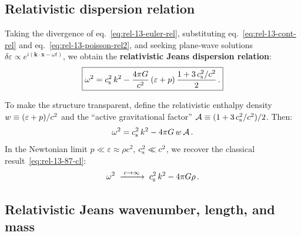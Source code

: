 \subsection{Relativistic dispersion relation}
\label{sec:rel-13-119d}

Taking the divergence of eq.~\eqref{eq:rel-13-euler-rel},
substituting eq.~\eqref{eq:rel-13-cont-rel} and
eq.~\eqref{eq:rel-13-poisson-rel2}, and seeking plane-wave
solutions $\delta\varepsilon \propto
e^{i(\mathbf{k}\cdot\mathbf{x} - \omega t)}$, we obtain the
\textbf{relativistic Jeans dispersion relation}:
\begin{equation}
\label{eq:rel-13-dispersion}
\boxed{
  \omega^{2}
  = c_{\mathrm{s}}^{2}\,k^{2}
    - \frac{4\pi G}{c^{2}}\,
      (\varepsilon + p)\,
      \frac{1 + 3\,c_{\mathrm{s}}^{2}/c^{2}}{2}\,.
}
\end{equation}

To make the structure transparent, define the relativistic
enthalpy density $w \equiv (\varepsilon + p)/c^{2}$ and
the ``active gravitational factor''
$\mathcal{A} \equiv (1 + 3\,c_{\mathrm{s}}^{2}/c^{2})/2$.  Then:
\begin{equation}
\label{eq:rel-13-dispersion-compact}
  \omega^{2}
  = c_{\mathrm{s}}^{2}\,k^{2}
    - 4\pi G\,w\,\mathcal{A}\,.
\end{equation}
In the Newtonian limit $p \ll \varepsilon \approx \rho c^{2}$,
$c_{\mathrm{s}}^{2} \ll c^{2}$, we recover the classical result~\eqref{eq:rel-13-87-cl}:
\begin{equation}
  \omega^{2}
  \;\xrightarrow{\;c\to\infty\;}
  \;c_{\mathrm{s}}^{2}\,k^{2} - 4\pi G\rho\,.
\end{equation}

\subsection{Relativistic Jeans wavenumber, length, and mass}
\label{sec:rel-13-119e}


